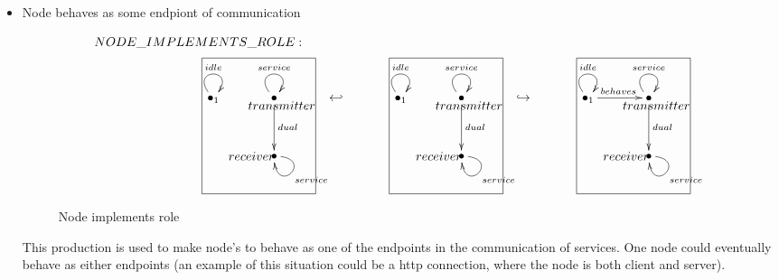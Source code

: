\documentclass[envcountsect,runningheads]{llncs}
\begin{document}
\begin{itemize}
  \item Node behaves as some endpiont of communication
  \begin{figure}[H]
    \[
       \xymatrix@C=35pt@R=35pt
       {
         {}\POS[]-<1pc,0pc>\drop{NODE\_IMPLEMENTS\_ROLE:}
         \\
         {\bullet}_{1} \ar@(ul,ur)^{idle} &
         {\bullet} \ar@(ul,ur)^{service} \ar@{->}^{dual}[d] \POS[]-<-0.5pc,.5pc> \drop{transmitter}
         & {\hookleftarrow} &
         {\bullet}_{1} \ar@(ul,ur)^{idle} &
         {\bullet} \ar@(ul,ur)^{service} \ar@{->}^{dual}[d] \POS[]-<-0.5pc,.5pc> \drop{transmitter}
         & {\hookrightarrow} &
         {\bullet}_{1} \ar@(ul,ur)^{idle}\ar@{->}^{behaves}[r]
         &
         {\bullet} \ar@(ul,ur)^{service} \ar@{->}^{dual}[d] \POS[]-<-0.5pc,.5pc> \drop{transmitter}
         \\
         & {\bullet} \ar@(r,d)^{service} \POS[]-<1.5pc,0pc> \drop{receiver}
         \POS[]+<-1pc,2pc> *+=<7.5pc,9pc>[F-]{} & & &
         {\bullet} \ar@(r,d)^{service} \POS[]-<1.5pc,0pc> \drop{receiver}
         \POS[]+<-1pc,2pc> *+=<7.5pc,9pc>[F-]{} & & &
         {\bullet} \ar@(r,d)^{service} \POS[]-<1.5pc,0pc> \drop{receiver}
         \POS[]+<-1pc,2pc> *+=<7.5pc,9pc>[F-]{}
       }
    \]
    \caption{Node implements role}
    \protect\label{fig:attachmentnodetoservice}
  \end{figure}
  This production is used to make node's to behave as one of the endpoints in 
  the communication of services. One node could eventually behave as either 
  endpoints (an example of this situation could be a http connection, where the node is 
  both client and server).\\


\end{itemize}
\end{document}
